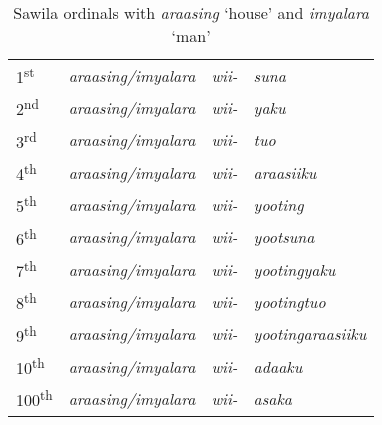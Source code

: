 \begin{table}\centering
\caption{Sawila ordinals with \textit{araasing} `house' and \textit{imyalara} `man' }





\begin{tabular}{llll}
1\textsuperscript{st} & \textit{araasing/imyalara} & \textit{wii-} & \textit{suna}\\
2\textsuperscript{nd} & \textit{araasing/imyalara} & \textit{wii-} & \textit{yaku}\\
3\textsuperscript{rd} & \textit{araasing/imyalara} & \textit{wii-} & \textit{tuo}\\
4\textsuperscript{th} & \textit{araasing/imyalara} & \textit{wii-} & \textit{araasiiku}\\
5\textsuperscript{th} & \textit{araasing/imyalara} & \textit{wii-} & \textit{yooting}\\
6\textsuperscript{th} & \textit{araasing/imyalara} & \textit{wii-} & \textit{yootsuna}\\
7\textsuperscript{th} & \textit{araasing/imyalara} & \textit{wii-} & \textit{yootingyaku}\\
8\textsuperscript{th} & \textit{araasing/imyalara} & \textit{wii-} & \textit{yootingtuo}\\
9\textsuperscript{th} & \textit{araasing/imyalara} & \textit{wii-} & \textit{yootingaraasiiku}\\
10\textsuperscript{th} & \textit{araasing/imyalara} & \textit{wii-} & \textit{adaaku}\\
100\textsuperscript{th} & \textit{araasing/imyalara} & \textit{wii-} & \textit{asaka}\\
\end{tabular}

\end{table}

